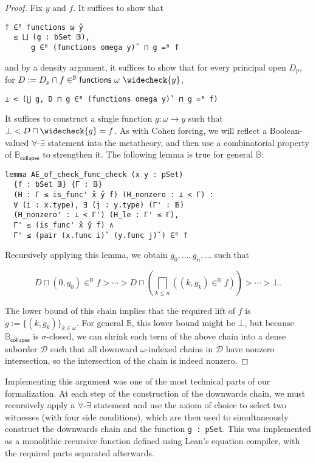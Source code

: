 \documentclass[sigplan,10pt,review]{acmart}
\newcommand{\B}{\mathbb{B}}
\theoremstyle{definition}
\begin{document}
\begin{proof}
  Fix \(y\) and \(f\). It suffices to show that
\begin{lstlisting}
f ∈ᴮ functions ω y̌
  ≤ ⨆ (g : bSet 𝔹),
      g ∈ᴮ (functions omega y)̌  ⊓ g =ᴮ f
\end{lstlisting}
  and by a density argument, it suffices to show that for every principal open \(D_p\), for \(D := D_p \cap f \in^{\B} \mathsf{functions}\ \omega \ \widecheck{y}\),
\begin{lstlisting}
⊥ < (⋃ g, D ⊓ g ∈ᴮ (functions omega y)̌  ⊓ g =ᴮ f)
\end{lstlisting}
  It suffices to construct a single function \(g : \omega \to y\) such that \(\bot < D \sqcap \widecheck{g} = f\).
  As with Cohen forcing, we will reflect a Boolean-valued \(\forall\)-\(\exists\) statement into the metatheory, and then use a combinatorial property of \(\mathbb{B}_{\mathsf{collapse}}\) to strengthen it.
  The following lemma is true for general \(\mathbb{B}\):
\begin{lstlisting}
lemma AE_of_check_func_check (x y : pSet)
  {f : bSet 𝔹} {Γ : 𝔹}
  (H : Γ ≤ is_func' x̌ y̌ f) (H_nonzero : ⊥ < Γ) :
  ∀ (i : x.type), ∃ (j : y.type) (Γ' : 𝔹)
  (H_nonzero' : ⊥ < Γ') (H_le : Γ' ≤ Γ),
  Γ' ≤ (is_func' x̌ y̌ f) ∧
  Γ' ≤ (pair (x.func i)̌  (y.func j)̌ ) ∈ᴮ f
\end{lstlisting}
Recursively applying this lemma, we obtain \(g_0, \dots, g_n, \dots\) such that

\[D \sqcap (0 , g_0) \in^{\mathbb{B}} f > \cdots > D \sqcap \left(\bigsqcap_{k \leq n} ((k, g_k) \in^{\mathbb{B}} f)\right) > \cdots > \bot. \]

The lower bound of this chain implies that the required lift of \(f\) is
\(g := \{(k, g_k)\}_{k \in \omega}\).
For general \(\mathbb{B}\), this lower bound might be \(\bot\), but because \(\mathbb{B}_{\mathsf{collapse}}\) is \(\sigma\)-closed,
we can shrink each term of the above chain into a dense suborder \(\mathcal{D}\) such that all downward \(\omega\)-indexed chains in \(\mathcal{D}\) have nonzero intersection, so the intersection of the chain is indeed nonzero.
\end{proof}

Implementing this argument was one of the most technical parts of our formalization. At each step of the construction of the downwards chain, we must recursively apply a \(\forall\)-\(\exists\) statement and use the axiom of choice to select two witnesses (with four side conditions), which are then used to simultaneously construct the downwards chain and the function \lstinline{g : pSet}. This was implemented as a monolithic recursive function defined using Lean's equation compiler, with the required parts separated afterwards.
\end{document}
